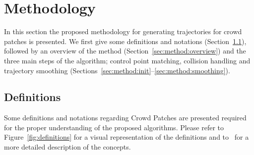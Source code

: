\section{Methodology}
\label{sec:method}




In this section the proposed methodology for generating trajectories for crowd patches is presented.
We first give some definitions and notations (Section~\ref{sec:method:definitions}), followed by an overview of the method (Section~\ref{sec:method:overview}) and the three main steps of the algorithm; control point matching,  collision handling and trajectory smoothing (Sections~\ref{sec:method:init}--\ref{sec:method:smoothing}).

\subsection{Definitions}
\label{sec:method:definitions}

Some definitions and notations regarding Crowd Patches are presented required for the proper understanding of the proposed algorithms.
Please refer to Figure~\ref{fig:definitions} for a visual representation of the definitions and to~\cite{Yersin:2009} for a more detailed description of the concepts.

